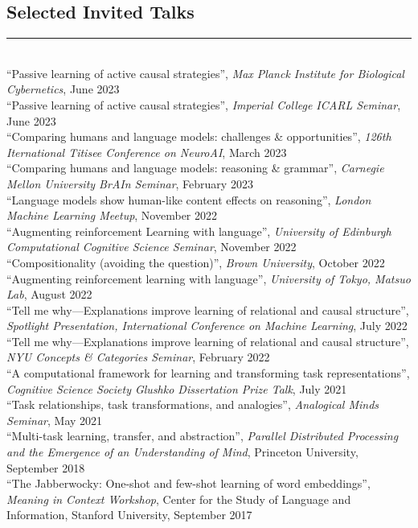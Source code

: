 \documentclass[margin]{res}
\begin{document}
\begin{resume}
\vspace{1pt}\section{Selected Invited Talks} \vspace{-15pt} \rule{\textwidth}{0.5pt} \\[3pt]
{``Passive learning of active causal strategies'',} \textit{Max Planck Institute for Biological Cybernetics}, June 2023\\[3pt]
{``Passive learning of active causal strategies'',} \textit{Imperial College ICARL Seminar}, June 2023\\[3pt]
{``Comparing humans and language models: challenges \& opportunities'',} \textit{126th Iternational Titisee Conference on NeuroAI}, March 2023\\[3pt] 
{``Comparing humans and language models: reasoning \& grammar'',} \textit{Carnegie Mellon University BrAIn Seminar}, February 2023\\[3pt] 
{``Language models show human-like content effects on reasoning'',} \textit{London Machine Learning Meetup}, November 2022\\[3pt] 
{``Augmenting reinforcement Learning with language'',} \textit{University of Edinburgh Computational Cognitive Science Seminar}, November 2022\\[3pt] 
{``Compositionality (avoiding the question)'',} \textit{Brown University}, October 2022\\[3pt] 
{``Augmenting reinforcement learning with language'',} \textit{University of Tokyo, Matsuo Lab}, August 2022\\[3pt] 
{``Tell me why---Explanations improve learning of relational and causal structure'',} \textit{Spotlight Presentation, International Conference on Machine Learning}, July 2022\\[3pt] 
{``Tell me why---Explanations improve learning of relational and causal structure'',} \textit{NYU Concepts \& Categories Seminar}, February 2022\\[3pt] 
{``A computational framework for learning and transforming task representations'',} \textit{Cognitive Science Society Glushko Dissertation Prize Talk}, July 2021\\[3pt] 
{``Task relationships, task transformations, and analogies'',} \textit{Analogical Minds Seminar}, May 2021\\[3pt] 
{``Multi-task learning, transfer, and abstraction'',} \textit{Parallel Distributed Processing and the Emergence of an Understanding of Mind}, Princeton University, September 2018\\[3pt] 
{``The Jabberwocky: One-shot and few-shot learning of word embeddings'',} \textit{Meaning in Context Workshop}, Center for the Study of Language and Information,  Stanford University, September 2017 
 

\end{resume}
\end{document}

